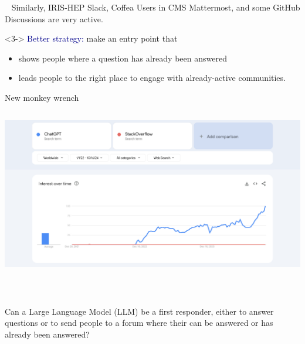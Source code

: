 \documentclass[aspectratio=169]{beamer}
\begin{document}
\begin{frame}{\mbox{ }}
\large
\vspace{0.5 cm}
Similarly, IRIS-HEP Slack, Coffea Users in CMS Mattermost, and some GitHub Discussions are very active.

\vspace{1 cm}

\vspace{1 cm}
\begin{uncoverenv}<3->
\textcolor{darkblue}{Better strategy:} make an entry point that

\vspace{0.25 cm}
\begin{itemize}
\item shows people where a question has already been answered
\item leads people to the right place to engage with already-active communities.
\end{itemize}
\end{uncoverenv}
\end{frame}

\begin{frame}{New monkey wrench}
\vspace{0.17 cm}
\begin{columns}
\includegraphics[width=\linewidth]{PLOTS/googletrends-chatgpt.png}
\end{columns}
\end{frame}

\begin{frame}{\mbox{ }}
\Large
\vspace{1 cm}

Can a Large Language Model (LLM) be a first responder, either to answer questions or to send people to a forum where their can be answered or has already been answered?

\vspace{0.5 cm}
\begin{center}
\end{center}
\end{frame}
\end{document}
